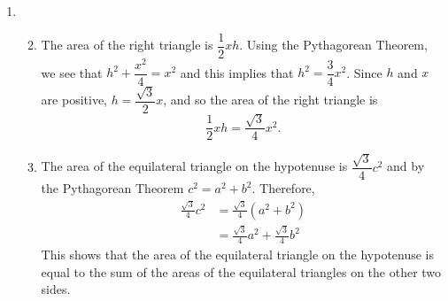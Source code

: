 \begin{enumerate}
\item \begin{enumerate} \setcounter{enumii}{1}
\item The area of the right triangle is $\dfrac{1}{2}xh$.  Using the Pythagorean Theorem, we see that $h^2 + \dfrac{x^2}{4} = x^2$ and this implies that $h^2 = \dfrac{3}{4} x^2$.  Since $h$ and $x$ are positive, $h = \dfrac{\sqrt{3}}{2} x$, and so the area of the right triangle is
\[
\frac{1}{2}xh = \frac{\sqrt{3}}{4}x^2.
\]

\item The area of the equilateral triangle on the hypotenuse is $\dfrac{\sqrt{3}}{4}c^2$ and by the Pythagorean Theorem $c^2 = a^2 + b^2$.  Therefore,
\begin{align*}
\frac{\sqrt{3}}{4}c^2 &= \frac{\sqrt{3}}{4}(a^2 + b^2) \\
                      &= \frac{\sqrt{3}}{4}a^2 + \frac{\sqrt{3}}{4}b^2
\end{align*}
This shows that the area of the equilateral triangle on the hypotenuse is equal to the sum of the areas of the equilateral triangles on the other two sides.
\end{enumerate}
\end{enumerate}



